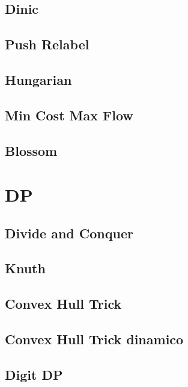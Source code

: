 \subsection{Dinic}
\raggedbottom
\hrulefill
\subsection{Push Relabel}
\raggedbottom
\hrulefill
\subsection{Hungarian}
\raggedbottom
\hrulefill
\subsection{Min Cost Max Flow}
\raggedbottom
\hrulefill
\subsection{Blossom}
\raggedbottom
\hrulefill

\section{DP}
\subsection{Divide and Conquer}
\raggedbottom
\hrulefill
\subsection{Knuth}
\raggedbottom
\hrulefill
\subsection{Convex Hull Trick}
\raggedbottom
\hrulefill
\subsection{Convex Hull Trick dinamico}
\raggedbottom
\hrulefill
\subsection{Digit DP}
\raggedbottom
\hrulefill
